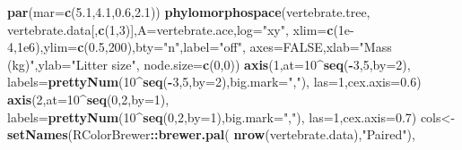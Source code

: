 \documentclass[fleqn,10pt,lineno]{wlpeerj} %
\newenvironment{Shaded}{\begin{snugshade}}{\end{snugshade}}
\newcommand{\AttributeTok}[1]{\textcolor[rgb]{0.13,0.29,0.53}{#1}}
\newcommand{\ConstantTok}[1]{\textcolor[rgb]{0.56,0.35,0.01}{#1}}
\newcommand{\DecValTok}[1]{\textcolor[rgb]{0.00,0.00,0.81}{#1}}
\newcommand{\FloatTok}[1]{\textcolor[rgb]{0.00,0.00,0.81}{#1}}
\newcommand{\FunctionTok}[1]{\textcolor[rgb]{0.13,0.29,0.53}{\textbf{#1}}}
\newcommand{\NormalTok}[1]{#1}
\newcommand{\OtherTok}[1]{\textcolor[rgb]{0.56,0.35,0.01}{#1}}
\newcommand{\SpecialCharTok}[1]{\textcolor[rgb]{0.81,0.36,0.00}{\textbf{#1}}}
\newcommand{\StringTok}[1]{\textcolor[rgb]{0.31,0.60,0.02}{#1}}
\begin{document}
\begin{Shaded}
\begin{Highlighting}[]
\FunctionTok{par}\NormalTok{(}\AttributeTok{mar=}\FunctionTok{c}\NormalTok{(}\FloatTok{5.1}\NormalTok{,}\FloatTok{4.1}\NormalTok{,}\FloatTok{0.6}\NormalTok{,}\FloatTok{2.1}\NormalTok{))}
\FunctionTok{phylomorphospace}\NormalTok{(vertebrate.tree,}
\NormalTok{  vertebrate.data[,}\FunctionTok{c}\NormalTok{(}\DecValTok{1}\NormalTok{,}\DecValTok{3}\NormalTok{)],}\AttributeTok{A=}\NormalTok{vertebrate.ace,}\AttributeTok{log=}\StringTok{"xy"}\NormalTok{,}
  \AttributeTok{xlim=}\FunctionTok{c}\NormalTok{(}\FloatTok{1e{-}4}\NormalTok{,}\FloatTok{1e6}\NormalTok{),}\AttributeTok{ylim=}\FunctionTok{c}\NormalTok{(}\FloatTok{0.5}\NormalTok{,}\DecValTok{200}\NormalTok{),}\AttributeTok{bty=}\StringTok{"n"}\NormalTok{,}\AttributeTok{label=}\StringTok{"off"}\NormalTok{,}
  \AttributeTok{axes=}\ConstantTok{FALSE}\NormalTok{,}\AttributeTok{xlab=}\StringTok{"Mass (kg)"}\NormalTok{,}\AttributeTok{ylab=}\StringTok{"Litter size"}\NormalTok{,}
  \AttributeTok{node.size=}\FunctionTok{c}\NormalTok{(}\DecValTok{0}\NormalTok{,}\DecValTok{0}\NormalTok{))}
\FunctionTok{axis}\NormalTok{(}\DecValTok{1}\NormalTok{,}\AttributeTok{at=}\DecValTok{10}\SpecialCharTok{\^{}}\FunctionTok{seq}\NormalTok{(}\SpecialCharTok{{-}}\DecValTok{3}\NormalTok{,}\DecValTok{5}\NormalTok{,}\AttributeTok{by=}\DecValTok{2}\NormalTok{),}
  \AttributeTok{labels=}\FunctionTok{prettyNum}\NormalTok{(}\DecValTok{10}\SpecialCharTok{\^{}}\FunctionTok{seq}\NormalTok{(}\SpecialCharTok{{-}}\DecValTok{3}\NormalTok{,}\DecValTok{5}\NormalTok{,}\AttributeTok{by=}\DecValTok{2}\NormalTok{),}\AttributeTok{big.mark=}\StringTok{","}\NormalTok{),}
  \AttributeTok{las=}\DecValTok{1}\NormalTok{,}\AttributeTok{cex.axis=}\FloatTok{0.6}\NormalTok{)}
\FunctionTok{axis}\NormalTok{(}\DecValTok{2}\NormalTok{,}\AttributeTok{at=}\DecValTok{10}\SpecialCharTok{\^{}}\FunctionTok{seq}\NormalTok{(}\DecValTok{0}\NormalTok{,}\DecValTok{2}\NormalTok{,}\AttributeTok{by=}\DecValTok{1}\NormalTok{),}
  \AttributeTok{labels=}\FunctionTok{prettyNum}\NormalTok{(}\DecValTok{10}\SpecialCharTok{\^{}}\FunctionTok{seq}\NormalTok{(}\DecValTok{0}\NormalTok{,}\DecValTok{2}\NormalTok{,}\AttributeTok{by=}\DecValTok{1}\NormalTok{),}\AttributeTok{big.mark=}\StringTok{","}\NormalTok{),}
  \AttributeTok{las=}\DecValTok{1}\NormalTok{,}\AttributeTok{cex.axis=}\FloatTok{0.7}\NormalTok{)}
\NormalTok{cols}\OtherTok{\textless{}{-}}\FunctionTok{setNames}\NormalTok{(RColorBrewer}\SpecialCharTok{::}\FunctionTok{brewer.pal}\NormalTok{(}
  \FunctionTok{nrow}\NormalTok{(vertebrate.data),}\StringTok{"Paired"}\NormalTok{),}

\end{Highlighting}
\end{Shaded}
\end{document}
